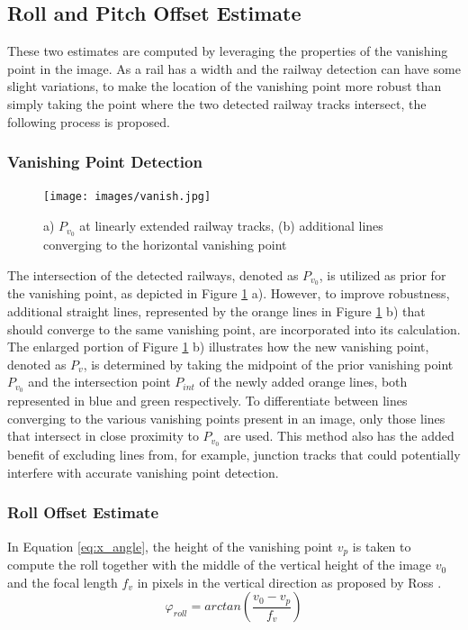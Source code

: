 \subsection{Roll and Pitch Offset Estimate}
These two estimates are computed by leveraging the properties of the vanishing point in the image. As a rail has a width and the railway detection can have some slight variations, to make the location of the vanishing point more robust than simply taking the point where the two detected railway tracks intersect, the following process is proposed.

\subsubsection{Vanishing Point Detection}
\begin{figure}[h]
   \centering
   \texttt{[image: images/vanish.jpg]}
   \caption{a) $P_{v_0}$ at linearly extended railway tracks, (b) additional lines converging to the horizontal vanishing point}
   \label{pics:x_angle}
\end{figure}


The intersection of the detected railways, denoted as $P_{v_0}$, is utilized as prior for the vanishing point, as depicted in Figure \ref{pics:x_angle} a). However, to improve robustness, additional straight lines, represented by the orange lines in Figure \ref{pics:x_angle} b) that should converge to the same vanishing point, are incorporated into its calculation. The enlarged portion of Figure \ref{pics:x_angle} b) illustrates how the new vanishing point, denoted as $P_{v}$, is determined by taking the midpoint of the prior vanishing point $P_{v_0}$ and the intersection point $P_{int}$ of the newly added orange lines, both represented in blue and green respectively. To differentiate between lines converging to the various vanishing points present in an image, only those lines that intersect in close proximity to $P_{v_0}$ are used. This method also has the added benefit of excluding lines from, for example, junction tracks that could potentially interfere with accurate vanishing point detection.
\newpage

\subsubsection{Roll Offset Estimate}
In Equation \ref{eq:x_angle}, the height of the vanishing point $v_p$ is taken to compute the roll together with the middle of the vertical height of the image $v_0$ and the focal length $f_v$ in pixels in the vertical direction as proposed by Ross \citep{ross2010vision}.
\begin{equation}
\varphi_{roll} = arctan(\frac{v_0 - v_p}{f_v}) 
\label{eq:x_angle}
\end{equation}


